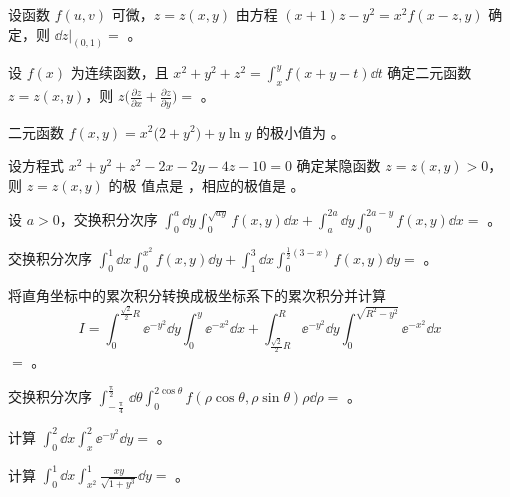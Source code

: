 \begin{ti}
	设函数 $f(u,v)$ 可微，$z = z(x,y)$ 由方程 $(x+1)z - y^2 = x^2 f(x-z,y)$ 确定，则 $\dd{z}|_{(0,1)} = $ \hua。
\end{ti}

\begin{ti}
	设 $f(x)$ 为连续函数，且 $x^2 + y^2 + z^2 = \int_x^y f(x+y-t) \dd{t}$ 确定二元函数 $z = z(x,y)$，则 $z \biggl( \frac{\partial z}{\partial x} + \frac{\partial z}{\partial y} \biggr) = $ \hua。
\end{ti}

\begin{ti}
	二元函数 $f(x,y) = x^2 \bigl( 2 + y^2 \bigr) + y \ln y$ 的极小值为 \hua。
\end{ti}

\begin{ti}
	设方程式 $x^2 + y^2 + z^2 - 2x - 2y - 4z - 10 = 0$ 确定某隐函数 $z = z(x,y) > 0$，则 $z = z(x,y)$ 的极 \hua{} 值点是 \hua，相应的极值是 \hua。
\end{ti}

\begin{ti}
	设 $a > 0$，交换积分次序 $\int_0^a \dd{y} \int_0^{\sqrt{ay}} f(x,y) \dd{x} + \int_a^{2a} \dd{y} \int_0^{2a-y} f(x,y) \dd{x} = $ \hua。
\end{ti}

\begin{ti}
	交换积分次序 $\int_0^1 \dd{x} \int_0^{x^2} f(x,y) \dd{y} + \int_1^3 \dd{x} \int_0^{\frac{1}{2}(3-x)} f(x,y) \dd{y} = $ \hua。
\end{ti}

\begin{ti}
	将直角坐标中的累次积分转换成极坐标系下的累次积分并计算
	\[
		I = \int_0^{\frac{\sqrt{2}}{2}R} \ee^{-y^2} \dd{y} \int_0^y \ee^{-x^2} \dd{x} + \int_{\frac{\sqrt{2}}{2}R}^R \ee^{-y^2} \dd{y} \int_0^{\sqrt{R^2-y^2}} \ee^{-x^2} \dd{x}
	\]
	$=$ \hua。
\end{ti}

\begin{ti}
	交换积分次序 $\int_{-\frac{\uppi}{4}}^{\frac{\uppi}{2}} \dd{\theta} \int_0^{2 \cos\theta} f(\rho \cos\theta,\rho \sin\theta) \rho \dd{\rho} = $ \hua。
\end{ti}

\begin{ti}
	计算 $\int_0^2 \dd{x} \int_x^2 \ee^{-y^2} \dd{y} = $ \hua。
\end{ti}

\begin{ti}
	计算 $\int_0^1 \dd{x} \int_{x^2}^1 \frac{xy}{\sqrt{1 + y^3}} \dd{y} = $ \hua。
\end{ti}

